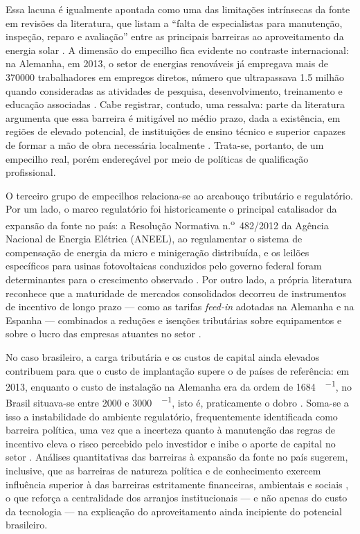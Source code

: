 Essa lacuna é igualmente apontada como uma das limitações intrínsecas da fonte
em revisões da literatura, que listam a ``falta de especialistas para
manutenção, inspeção, reparo e avaliação'' entre as principais barreiras ao
aproveitamento da energia solar \cite{Queiroz2020}. A dimensão do
empecilho fica evidente no contraste internacional: na Alemanha, em 2013, o
setor de energias renováveis já empregava mais de \num{370000} trabalhadores em
empregos diretos, número que ultrapassava \num{1,5} milhão quando consideradas as
atividades de pesquisa, desenvolvimento, treinamento e educação associadas
\cite{Queiroz2020}. Cabe registrar, contudo, uma ressalva: parte da literatura
argumenta que essa barreira é mitigável no médio prazo, dada a existência, em
regiões de elevado potencial, de instituições de ensino técnico e superior
capazes de formar a mão de obra necessária localmente \cite{Fratea2017}. Trata-se,
portanto, de um empecilho real, porém endereçável por meio de políticas de
qualificação profissional.

O terceiro grupo de empecilhos relaciona-se ao arcabouço tributário e
regulatório. Por um lado, o marco regulatório foi historicamente o principal
catalisador da expansão da fonte no país: a Resolução Normativa
n.\textsuperscript{o}~482/2012 da Agência Nacional de Energia Elétrica (ANEEL),
ao regulamentar o sistema de compensação de energia da micro e minigeração
distribuída, e os leilões específicos para usinas fotovoltaicas conduzidos pelo
governo federal foram determinantes para o crescimento observado
\cite{Urbanetz2018}. Por outro lado, a própria literatura reconhece que a
maturidade de mercados consolidados decorreu de instrumentos de incentivo de
longo prazo --- como as tarifas \textit{feed-in} adotadas na Alemanha e na
Espanha --- combinados a reduções e isenções tributárias sobre equipamentos e
sobre o lucro das empresas atuantes no setor \cite{Fratea2017,Queiroz2020}.

No caso brasileiro, a carga tributária e os custos de capital ainda elevados
contribuem para que o custo de implantação supere o de países de referência: em
2013, enquanto o custo de instalação na Alemanha era da ordem de
\SI{1684}{\text{\euro}\per\kWp}, no Brasil situava-se entre \num{2000} e
\SI{3000}{\text{\euro}\per\kWp}, isto é, praticamente o dobro \cite{Queiroz2020}.
Soma-se a isso a instabilidade do ambiente regulatório, frequentemente
identificada como barreira política, uma vez que a incerteza quanto à
manutenção das regras de incentivo eleva o risco percebido pelo investidor e
inibe o aporte de capital no setor \cite{Queiroz2020,Fratea2017}. Análises
quantitativas das barreiras à expansão da fonte no país sugerem, inclusive, que
as barreiras de natureza política e de conhecimento exercem influência superior
à das barreiras estritamente financeiras, ambientais e sociais
\cite{Queiroz2020}, o que reforça a centralidade dos arranjos institucionais ---
e não apenas do custo da tecnologia --- na explicação do aproveitamento ainda
incipiente do potencial brasileiro.

